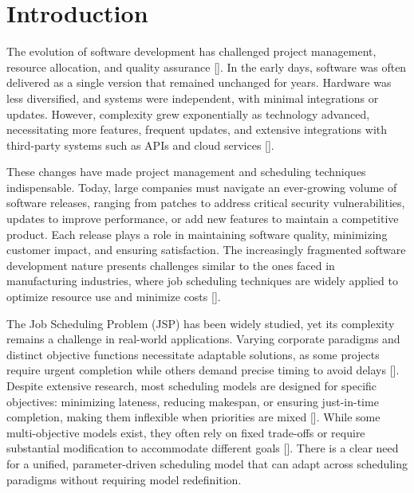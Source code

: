 \documentclass[12pt]{article}
\begin{document}
\section*{Introduction}

The evolution of software development has challenged project management, resource allocation, and quality assurance []. In the early days, software was often delivered as a single version that remained unchanged for years. Hardware was less diversified, and systems were independent, with minimal integrations or updates. However, complexity grew exponentially as technology advanced, necessitating more features, frequent updates, and extensive integrations with third-party systems such as APIs and cloud services [].

These changes have made project management and scheduling techniques indispensable. Today, large companies must navigate an ever-growing volume of software releases, ranging from patches to address critical security vulnerabilities, updates to improve performance, or add new features to maintain a competitive product. Each release plays a role in maintaining software quality, minimizing customer impact, and ensuring satisfaction. The increasingly fragmented software development nature presents challenges similar to the ones faced in manufacturing industries, where job scheduling techniques are widely applied to optimize resource use and minimize costs []. %

The Job Scheduling Problem (JSP) has been widely studied, yet its complexity remains a challenge in real-world applications. Varying corporate paradigms and distinct objective functions necessitate adaptable solutions, as some projects require urgent completion while others demand precise timing to avoid delays []. Despite extensive research, most scheduling models are designed for specific objectives: minimizing lateness, reducing makespan, or ensuring just-in-time completion, making them inflexible when priorities are mixed []. While some multi-objective models exist, they often rely on fixed trade-offs or require substantial modification to accommodate different goals []. There is a clear need for a unified, parameter-driven scheduling model that can adapt across scheduling paradigms without requiring model redefinition.

\end{document}
